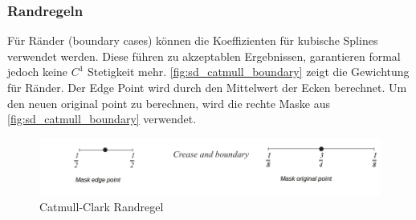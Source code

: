 \subsubsection*{Randregeln}

Für Ränder (boundary cases) können die Koeffizienten für kubische Splines verwendet werden.
Diese führen zu akzeptablen Ergebnissen, garantieren formal jedoch keine \(C^1\) Stetigkeit mehr. \cite[S. 75f]{Zorin.subdivcourse}
\autoref{fig:sd_catmull_boundary} zeigt die Gewichtung für Ränder.
Der Edge Point wird durch den Mittelwert der Ecken berechnet.
Um den neuen original point zu berechnen, wird die rechte Maske aus \autoref{fig:sd_catmull_boundary}
verwendet.

\begin{figure}
\centering
\includegraphics[width=1.0\textwidth]{content/media/sd_catmull_boundary.jpg}
\caption{Catmull-Clark Randregel \cite[S. 76]{Zorin.subdivcourse}}
\label{fig:sd_catmull_boundary}
\end{figure}




